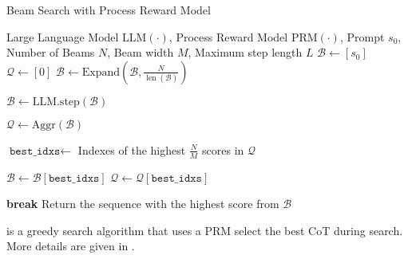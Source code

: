 
\begin{algorithm}[ht]
\caption{Beam Search with Process Reward Model}
\label{alg:beam}
\begin{algorithmic}[1]
\REQUIRE Large Language Model $\text{LLM}(\cdot)$, Process Reward Model $\text{PRM}(\cdot)$, Prompt $s_0$, Number of Beams $N$, Beam width $M$, Maximum step length $L$
\STATE $\mathcal{B} \gets [s_0]$
\STATE $\mathcal{Q} \gets [0]$
    \STATE $\mathcal{B} \gets \text{Expand}(\mathcal{B}, \frac{N}{\operatorname{len}(\mathcal{B})})$

    \STATE $\mathcal{B} \gets \text{LLM.step}(\mathcal{B})$


    \STATE $\mathcal{Q} \gets \text{Aggr}(\mathcal{B})$

    \STATE $\texttt{best\_idxs} \gets$ Indexes of the highest $\frac{N}{M}$ scores in $\mathcal{Q}$

    \STATE $\mathcal{B} \gets \mathcal{B}[\texttt{best\_idxs}]$
    \STATE $\mathcal{Q} \gets \mathcal{Q}[\texttt{best\_idxs}]$
    
        \STATE \textbf{break}
    \ENDIF
\ENDFOR
\STATE Return the sequence with the highest score from $\mathcal{B}$

\end{algorithmic}
\end{algorithm}



 is a greedy search algorithm that uses a PRM select the best CoT during search. More details are given in .


\clearpage


